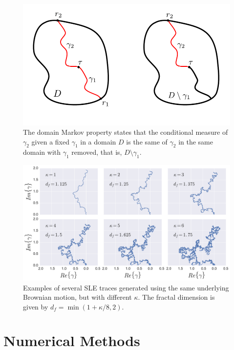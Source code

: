 \begin{figure}
\begin{center}
    \includegraphics[scale=0.9]{chapters/ch4-sle/figs/dmp}
\end{center}
\caption{The domain Markov property states that the conditional measure of
    $\gamma_2$ given a fixed $\gamma_1$ in a domain $D$ is the same of $\gamma_2$
    in the same domain with $\gamma_1$ removed, that is, $D\setminus\gamma_1$.}
\label{fig:dmp}
\end{figure}


\begin{figure}
\begin{center}
    \includegraphics[scale=0.5]{chapters/ch4-sle/figs/slefracdim}
\end{center}
\caption{Examples of several SLE traces generated using the same underlying
    Brownian motion, but with different $\kappa$. The fractal dimension is
    given by $d_f=\min(1+\kappa/8, 2)$.}
\label{fig:slefracdim}
\end{figure}


\section{Numerical Methods}
\label{sec:num}

